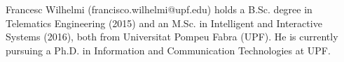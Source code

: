 \documentclass[journal]{IEEEtran}
\begin{document}
\ifCLASSOPTIONcaptionsoff
  \newpage
\fi





%
%
%
%
%

% 

\begin{IEEEbiographynophoto}{Francesc Wilhelmi}
(francisco.wilhelmi@upf.edu) holds a B.Sc. degree in Telematics Engineering (2015) and an M.Sc. in Intelligent and Interactive Systems (2016), both from Universitat Pompeu Fabra (UPF). He is currently pursuing a Ph.D. in Information and Communication Technologies at UPF.
\end{IEEEbiographynophoto}
\end{document}
